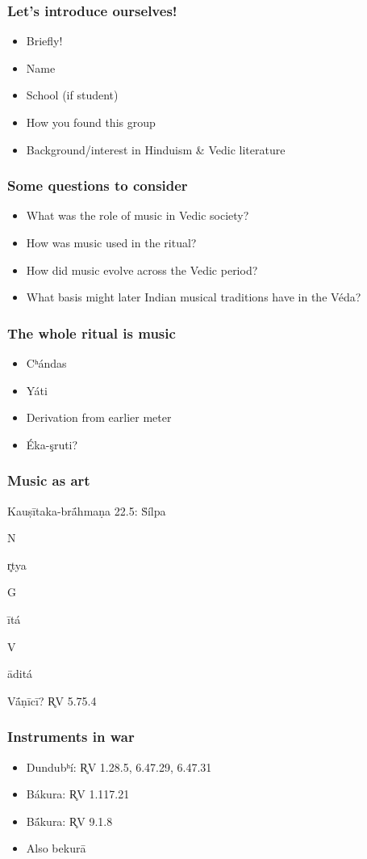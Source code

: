 \documentclass[pdf]{beamer}
\newcommand{\Subitem}[1]{{\setlength\itemindent{12pt} \item[-] #1}}
\begin{document}
\begin{frame} \frametitle{Let's introduce ourselves!}
\begin{itemize}
	\item Briefly!
	\item Name
	\item School (if student)
	\item How you found this group
	\item Background/interest in Hinduism \& Vedic literature
\end{itemize}
\end{frame}

\begin{frame}[label=questions] \frametitle{Some questions to consider}
\begin{itemize}
	\item What was the role of music in Vedic society?
	\item How was music used in the ritual?
	\item How did music evolve across the Vedic period?
	\item What basis might later Indian musical traditions have in the Véda?
\end{itemize}
\end{frame}

\begin{frame} \frametitle{The whole ritual is music}
\begin{itemize}
	\item Cʰándas
	\item Yáti
	\item Derivation from earlier meter
	\item Éka-şruti?
\end{itemize}
\end{frame}

\begin{frame} \frametitle{Music as art}
\begin{itemize}
	\item Kauṣītaka-brā́hmaṇa 22.5: Ṡílpa
	\Subitem Nr̥tya
	\Subitem Gītá
	\Subitem Vāditá
	\item Vā́ṇīcī? R̥V 5.75.4
\end{itemize}
\end{frame}

\begin{frame} \frametitle{Instruments in war}
\begin{itemize}
	\item Dundubʰí: R̥V 1.28.5, 6.47.29, 6.47.31
	\item Bákura: R̥V 1.117.21
	\item Bā́kura: R̥V 9.1.8
	\item Also bekurā
\end{itemize}
\end{frame}
\end{document}
